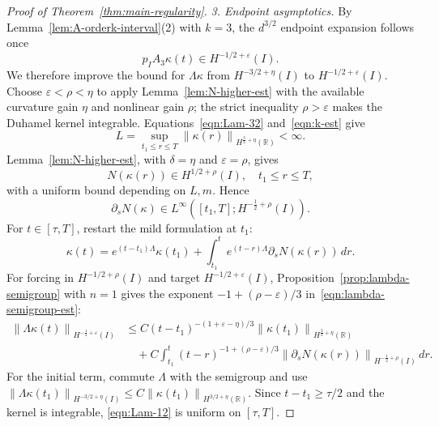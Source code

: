 \documentclass[11pt,reqno]{amsart}
\theoremstyle{plain}
\theoremstyle{definition}
\numberwithin{equation}{section}
\newcommand{\paren}[1]{\left(#1\right)}
\newcommand{\p}{\partial}
\newcommand{\norm}[1]{\left\lVert #1 \right\rVert}
\newcommand{\R}{\mathbb{R}}
\newcommand{\hi}[1]{H^{#1}(I)}
\newcommand{\hr}[1]{H^{#1}(\R)}
\begin{document}
\begin{proof}[Proof of Theorem~\ref{thm:main-regularity}]
\emph{3. Endpoint asymptotics.}
By Lemma~\ref{lem:A-orderk-interval}(2) with $k=3$, the $d^{3/2}$
endpoint expansion follows once
\begin{equation*}
    p_I A_3\kappa(t)\in H^{-1/2+\varepsilon}(I).
\end{equation*}
We therefore improve the bound for $\Lambda\kappa$ from
$H^{-3/2+\eta}(I)$ to $H^{-1/2+\varepsilon}(I)$.
Choose $\varepsilon<\rho<\eta$ to apply Lemma~\ref{lem:N-higher-est}
with the available curvature gain $\eta$ and nonlinear gain $\rho$;
the strict inequality $\rho>\varepsilon$ makes the Duhamel kernel integrable.
Equations~\eqref{eqn:Lam-32} and~\eqref{eqn:k-est} give
\begin{equation*}
    L=\sup_{t_1\le r\le T}
        \norm{\kappa(r)}_{\hr{\frac32+\eta}}<\infty.
\end{equation*}
Lemma~\ref{lem:N-higher-est}, with
$\delta=\eta$ and $\varepsilon=\rho$, gives
\begin{equation}
    N(\kappa(r))\in H^{1/2+\rho}(I),\quad t_1\le r\le T,
\end{equation}
with a uniform bound depending on $L,m$. Hence
\begin{equation}\label{eqn:pN-hi}
    \p_sN(\kappa)\in
    L^\infty\paren{[t_1,T];\hi{-\frac12+\rho}}.
\end{equation}
For $t\in[\tau,T]$, restart the mild formulation at $t_1$:
\begin{equation}
    \kappa(t)=e^{(t-t_1)\Lambda}\kappa(t_1)
        +\int_{t_1}^t e^{(t-r)\Lambda}\p_sN(\kappa(r))\,dr.
\end{equation}
For forcing in $H^{-1/2+\rho}(I)$ and target
$H^{-1/2+\varepsilon}(I)$, Proposition~\ref{prop:lambda-semigroup}
with $n=1$ gives the exponent $-1+(\rho-\varepsilon)/3$ in~\eqref{eqn:lambda-semigroup-est}:
\begin{equation}\label{eqn:Lam-12}
\begin{aligned}
    \norm{\Lambda\kappa(t)}_{\hi{-\frac12+\varepsilon}}
    &\le C(t-t_1)^{-(1+\varepsilon-\eta)/3}
        \norm{\kappa(t_1)}_{\hr{\frac32+\eta}}\\
    &\quad+C\int_{t_1}^t
        (t-r)^{-1+(\rho-\varepsilon)/3}
        \norm{\p_sN(\kappa(r))}_{\hi{-\frac12+\rho}}\,dr.
\end{aligned}
\end{equation}
For the initial term, commute $\Lambda$ with the semigroup and use
$\norm{\Lambda\kappa(t_1)}_{\hi{-3/2+\eta}}
\le C\norm{\kappa(t_1)}_{\hr{3/2+\eta}}$.
Since $t-t_1\ge\tau/2$ and the kernel is integrable,
\eqref{eqn:Lam-12} is uniform on $[\tau,T]$.


\end{proof}
\end{document}
